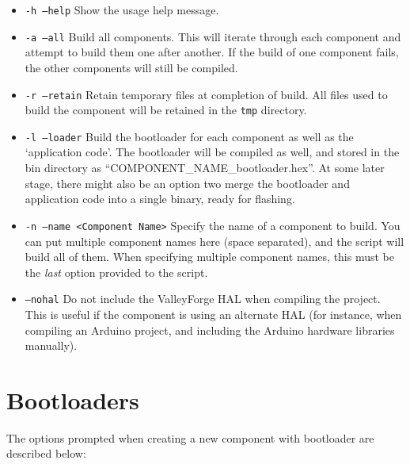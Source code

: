 \documentclass[a4paper, oneside, 11pt, titlepage, onecolumn, openright]{report}
\begin{document}
				\begin{itemize}
			
					\item \texttt{-h --help} Show the usage help message.
			
					\item	\texttt{-a --all} Build all components. This will iterate through each component and attempt to build them one after another.  If the build of one component fails, the other components will still be compiled.
			
					\item	\texttt{-r --retain} Retain temporary files at completion of build. All files used to build the component will be retained in the \texttt{tmp} directory.
			
					\item	\texttt{-l --loader} Build the bootloader for each component as well as the `application code'. The bootloader will be compiled as well, and stored in the bin directory as ``COMPONENT\_NAME\_bootloader.hex''.  At some later stage, there might also be an option two merge the bootloader and application code into a single binary, ready for flashing.
			
					\item	\texttt{-n --name <Component Name>}	Specify the name of a component to build. You can put multiple component names here (space separated), and the script will build all of them. When specifying multiple component names, this must be the \emph{last} option provided to the script.
			
					\item   \texttt{--nohal} Do not include the ValleyForge HAL when compiling the project.  This is useful if the component is using an alternate HAL (for instance, when compiling an Arduino project, and including the Arduino hardware libraries manually).
			
				\end{itemize} 			

		\chapter{Bootloaders}
			\label{c:Bootloaders}

			The options prompted when creating a new component with bootloader are described below:
		
\end{document}

